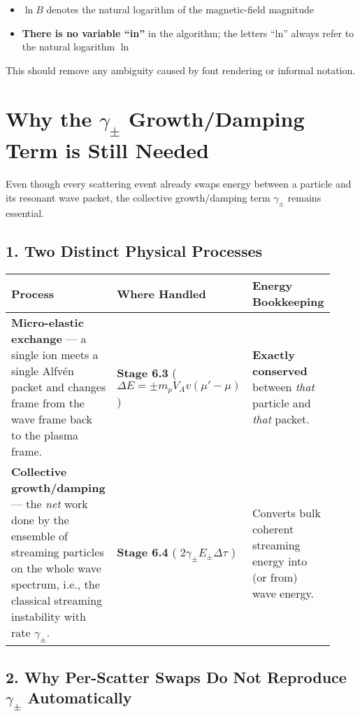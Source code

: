 {\begin{itemize}
  \item \( \ln B \) denotes the natural logarithm of the magnetic-field magnitude
  \item \textbf{There is no variable “in”} in the algorithm; the letters “ln” always refer to the natural logarithm \( \ln \)
\end{itemize}

This should remove any ambiguity caused by font rendering or informal notation.

\section*{Why the \( \gamma_\pm \) Growth/Damping Term is Still Needed}

Even though every scattering event already swaps energy between a particle and its resonant wave packet, the collective growth/damping term \( \gamma_\pm \) remains essential.

\subsection*{1. Two Distinct Physical Processes}

\begin{tabular}{|p{0.42\linewidth}|p{0.22\linewidth}|p{0.28\linewidth}|}
\hline
\textbf{Process} & \textbf{Where Handled} & \textbf{Energy Bookkeeping} \\ \hline
\textbf{Micro-elastic exchange} — a single ion meets a single Alfvén packet and changes frame from the wave frame back to the plasma frame. &
\textbf{Stage 6.3} \newline ( \( \Delta E = \pm m_p V_A v (\mu' - \mu) \) ) &
\textbf{Exactly conserved} between \emph{that} particle and \emph{that} packet. \\ \hline
\textbf{Collective growth/damping} — the \emph{net} work done by the ensemble of streaming particles on the whole wave spectrum, i.e., the classical streaming instability with rate \( \gamma_\pm \). &
\textbf{Stage 6.4} \newline ( \( 2\gamma_\pm E_\pm \Delta \tau \) ) &
Converts bulk coherent streaming energy into (or from) wave energy. \\ \hline
\end{tabular}

\subsection*{2. Why Per-Scatter Swaps Do Not Reproduce \( \gamma_\pm \) Automatically}

}
